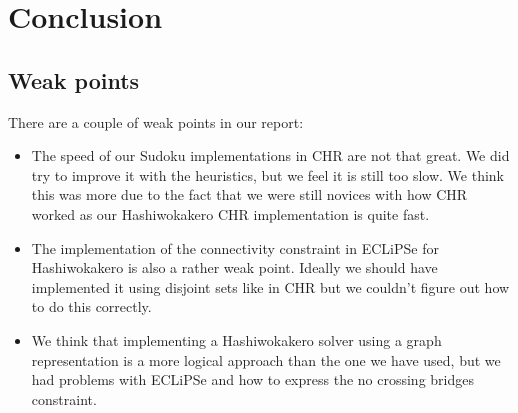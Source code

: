 \documentclass{report}
\newcommand{\mychapter}[2]{
    \setcounter{chapter}{#1}
    \setcounter{section}{0}
    \chapter*{#2}
    \addcontentsline{toc}{chapter}{#2}
}
\begin{document}
\begin{table}[H]		
	\centering		
	\caption{Results when using ten subpopulations.}		
	\label{tab:diversity10}		
\end{table}


\newpage

\mychapter{2}{Conclusion}

\section{Weak points}
There are a couple of weak points in our report:
\begin{itemize}
    \item The speed of our Sudoku implementations in CHR are not that great. We did try to improve it with the heuristics, but we feel it is still too slow. We think this was more due to the fact that we were still novices with how CHR worked as our Hashiwokakero CHR implementation is quite fast.
    \item The implementation of the connectivity constraint in ECLiPSe for Hashiwokakero is also a rather weak point. Ideally we should have implemented it using disjoint sets like in CHR but we couldn't figure out how to do this correctly.
    \item We think that implementing a Hashiwokakero solver using a graph representation is a more logical approach than the one we have used, but we had problems with ECLiPSe and how to express the no crossing bridges constraint.
\end{itemize}
\end{document}
